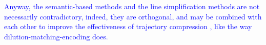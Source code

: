 \textcolor{blue}{Anyway, the semantic-based methods and the line simplification methods are not necessarily contradictory, indeed, they are orthogonal, and may be combined with each other to improve the effectiveness of trajectory compression \cite{Lin:Cised}, like the way dilution-matching-encoding \cite{Gotsman:Compaction} does.}



